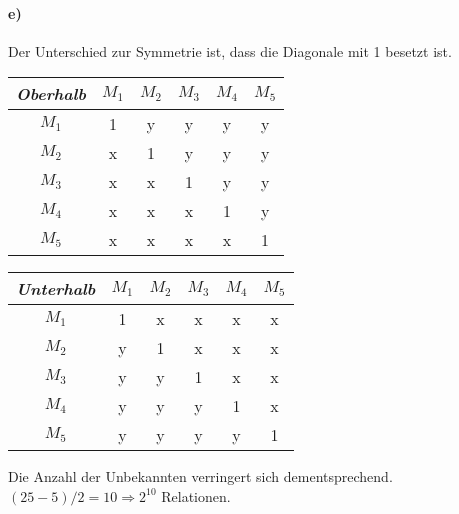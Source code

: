 \documentclass[titlepage]{article}
\theoremstyle{plain}
\newcommand{\1}{\mathbb{1}}
\newcommand{\0}{\mathbb{0}}
\begin{document}
		\paragraph{e)} Der Unterschied zur Symmetrie ist, dass die Diagonale mit 1 besetzt ist. 
			\begin{table}[h]
				\begin{tabular}{c|ccccc}
					\textit{Oberhalb}&$M_1$&$M_2$&$M_3$&$M_4$&$M_5$\\\hline
					$M_1$&1&y&y&y&y\\
					$M_2$&x&1&y&y&y\\
					$M_3$&x&x&1&y&y\\
					$M_4$&x&x&x&1&y\\
					$M_5$&x&x&x&x&1
				\end{tabular}
				\begin{tabular}{c|ccccc}
					\textit{Unterhalb}&$M_1$&$M_2$&$M_3$&$M_4$&$M_5$\\\hline
					$M_1$&1&x&x&x&x\\
					$M_2$&y&1&x&x&x\\
					$M_3$&y&y&1&x&x\\
					$M_4$&y&y&y&1&x\\
					$M_5$&y&y&y&y&1
				\end{tabular}
			\end{table}
		
		Die Anzahl der Unbekannten verringert sich dementsprechend. $(25-5)/2=10\Rightarrow 2^{10}$ Relationen.
	
\end{document}

